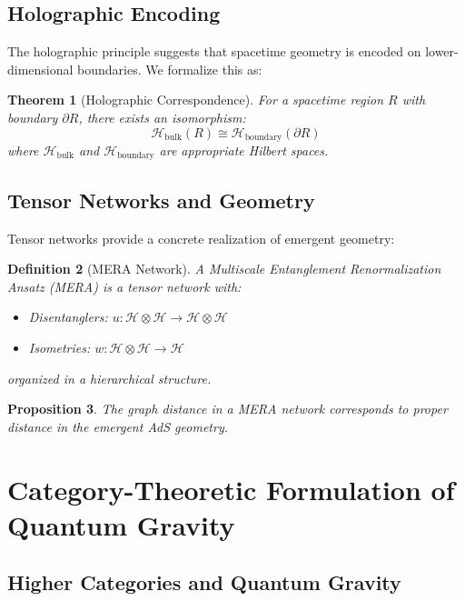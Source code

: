 \documentclass[11pt,a4paper]{article}
\newtheorem{theorem}{Theorem}[section]
\newtheorem{proposition}[theorem]{Proposition}
\newtheorem{definition}[theorem]{Definition}
\begin{document}
\subsection{Holographic Encoding}

The holographic principle suggests that spacetime geometry is encoded on lower-dimensional boundaries. We formalize this as:

\begin{theorem}[Holographic Correspondence]
For a spacetime region $R$ with boundary $\partial R$, there exists an isomorphism:
\[
\mathcal{H}_{\text{bulk}}(R) \cong \mathcal{H}_{\text{boundary}}(\partial R)
\]
where $\mathcal{H}_{\text{bulk}}$ and $\mathcal{H}_{\text{boundary}}$ are appropriate Hilbert spaces.
\end{theorem}

\subsection{Tensor Networks and Geometry}

Tensor networks provide a concrete realization of emergent geometry:

\begin{definition}[MERA Network]
A Multiscale Entanglement Renormalization Ansatz (MERA) is a tensor network with:
\begin{itemize}
\item Disentanglers: $u: \mathcal{H} \otimes \mathcal{H} \to \mathcal{H} \otimes \mathcal{H}$
\item Isometries: $w: \mathcal{H} \otimes \mathcal{H} \to \mathcal{H}$
\end{itemize}
organized in a hierarchical structure.
\end{definition}

\begin{proposition}
The graph distance in a MERA network corresponds to proper distance in the emergent AdS geometry.
\end{proposition}

\section{Category-Theoretic Formulation of Quantum Gravity}

\subsection{Higher Categories and Quantum Gravity}
\end{document}
